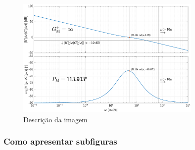 \documentclass[12pt]{article}
\begin{document}
\begin{figure}[H]
	\begin{center}
 		\includegraphics[width = 0.8\textwidth]{Imagens/Image.eps}
 		\caption{Descrição da imagem}
 		\label{fig:1}
	\end{center} 
\end{figure}

\subsubsection{Como apresentar subfiguras}
\end{document}
